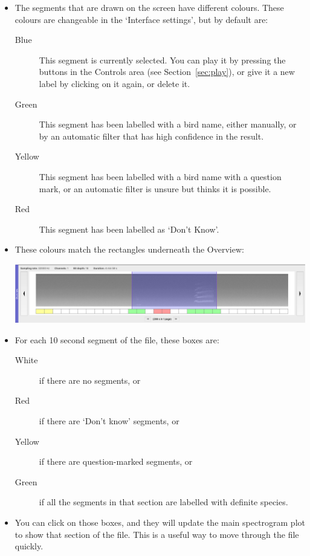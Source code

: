 \documentclass{article}
\begin{document}
\begin{itemize}

\item The segments that are drawn on the screen have different colours. These colours are changeable in the `Interface settings', but by default are:
	\begin{description} 
	\item[Blue] This segment is currently selected. You can play it by pressing the buttons in the Controls area (see Section~\ref{sec:play}), or give it a new label by clicking on it again, or delete it. 
	\item[Green] This segment has been labelled with a bird name, either manually, or by an automatic filter that has high confidence in the result.
	\item[Yellow] This segment has been labelled with a bird name with a question mark, or an automatic filter is unsure but thinks it is possible. 
	\item[Red] This segment has been labelled as `Don't Know'.
	\end{description}

\item These colours match the rectangles underneath the Overview:

\begin{center}
\includegraphics[width=.6\textwidth]{Figures/Overview}
\end{center}

\item For each 10 second segment of the file, these boxes are:
	\begin{description} 
 	\item[White] if there are no segments, or
	\item[Red] if there are `Don't know' segments, or
	\item[Yellow] if there are question-marked segments, or 
	\item[Green] if all the segments in that section are labelled with definite species. 
	\end{description}
	
\item You can click on those boxes, and they will update the main spectrogram plot to show that section of the file. This is a useful way to move through the file quickly.
\end{itemize}
\end{document}
